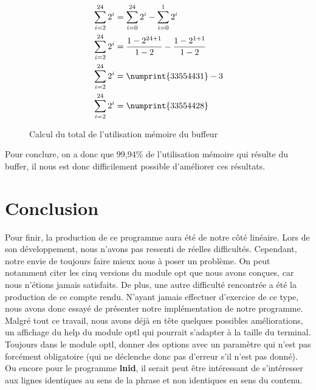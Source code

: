 \documentclass[12pt]{article}
\begin{document}
    \begin{figure}[H]
        \centering
        \begin{equation}
            \begin{split}
                & \sum_{i = 2}^{24} 2^i =  \sum_{i = 0}^{24} 2^i - 
                \sum_{i = 0}^{1} 2^i \\
                & \sum_{i = 2}^{24} 2^i = \dfrac{1 - 2^{24+1}}{1 - 2} - 
                \dfrac{1 - 2^{1+1}}{1 - 2} \\
                & \sum_{i = 2}^{24} 2^i = \numprint{33554431} - 3 \\
                & \sum_{i = 2}^{24} 2^i = \numprint{33554428} \\
            \end{split}
        \end{equation}
        \caption{Calcul du total de l'utilisation mémoire du buffeur}
    \end{figure}

    Pour conclure, on a donc que 99,94\% de l'utilisation mémoire qui résulte du
    buffer, il nous est donc difficilement possible d'améliorer ces résultats.

    \newpage

    \section{Conclusion}

    Pour finir, la production de ce programme aura été de notre côté linéaire. 
    Lors de son développement, nous n'avons pas ressenti de réelles difficultés. 
    Cependant, notre envie de toujours faire mieux nous à poser un problème. On 
    peut notamment citer les cinq versions du module opt que nous avons conçues, 
    car nous n'étions jamais satisfaits. De plus, une autre difficulté 
    rencontrée a été la production de ce compte rendu. N'ayant jamais 
    effectuer d'exercice de ce type, nous avons donc essayé de présenter notre 
    implémentation de notre programme. Malgré tout ce travail, nous avons 
    déjà en tête quelques possibles améliorations, un affichage du help du module 
    optl qui pourrait s'adapter à la taille du terminal. Toujours dans le 
    module optl, donner des options avec un paramètre qui n'est pas forcément 
    obligatoire (qui ne déclenche donc pas d'erreur s'il n'est pas donné). Ou 
    encore pour le programme \textbf{lnid}, il serait peut être intéressant de 
    s'intéresser aux lignes identiques au sens de la phrase et non identiques en 
    sens du contenu.
\end{document}

